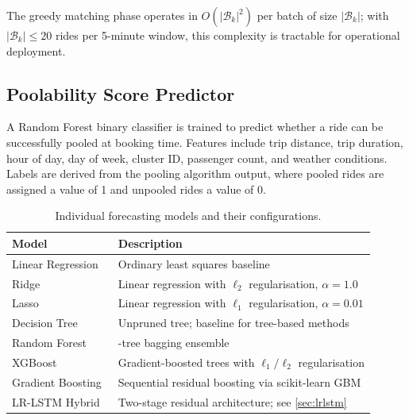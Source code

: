 \documentclass[a4paper,fleqn]{cas-dc}
\begin{document}
The greedy matching phase operates in $O(|\mathcal{B}_k|^2)$ per batch of size $|\mathcal{B}_k|$; with $|\mathcal{B}_k|\leq 20$ rides per 5-minute window, this complexity is tractable for operational deployment.

\subsection{Poolability Score Predictor}
\label{sec:poolability}

A Random Forest binary classifier is trained to predict whether a ride can be successfully pooled at booking time.  Features include trip distance, trip duration, hour of day, day of week, cluster ID, passenger count, and weather conditions.  Labels are derived from the pooling algorithm output, where pooled rides are assigned a value of 1 and unpooled rides a value of 0.

\begin{table}[t]
\centering
\caption{Individual forecasting models and their configurations.\label{tab:individual_models}}
\begin{tabularx}{\columnwidth}{>{\raggedright\arraybackslash}p{2.2cm} >{\raggedright\arraybackslash}X}
\toprule
\textbf{Model} & \textbf{Description} \\
\toprule
Linear Regression & Ordinary least squares baseline \\
Ridge~\cite{hoerl1970ridge} & Linear regression with $\ell_2$ regularisation, $\alpha=1.0$ \\
Lasso~\cite{tibshirani1996lasso} & Linear regression with $\ell_1$ regularisation, $\alpha=0.01$ \\
Decision Tree & Unpruned tree; baseline for tree-based methods \\
Random Forest~\cite{breiman2001rf} & 200-tree bagging ensemble \\
XGBoost~\cite{chen2016xgboost} & Gradient-boosted trees with $\ell_1/\ell_2$ regularisation \\
Gradient Boosting~\cite{friedman2001gbm} & Sequential residual boosting via scikit-learn GBM \\
LR-LSTM Hybrid~\cite{hochreiter1997long} & Two-stage residual architecture; see \autoref{sec:lrlstm} \\
\bottomrule
\end{tabularx}
\end{table}

\FloatBarrier

\end{document}
